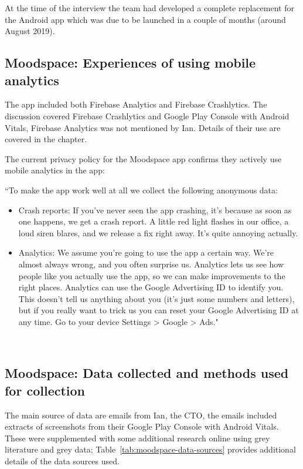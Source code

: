 At the time of the interview the team had developed a complete replacement for the Android app which was due to be launched in a couple of months (around August 2019).

\subsection{Moodspace: Experiences of using mobile analytics}
The app included both Firebase Analytics and Firebase Crashlytics. The discussion covered Firebase Crashlytics and Google Play Console with Android Vitals, Firebase Analytics was not mentioned by Ian. Details of their use are covered in the  chapter.

The current privacy policy for the Moodspace app confirms they actively use mobile analytics in the app: 

{\small
``To make the app work well at all we collect the following anonymous data:
    \begin{itemize}
        \itemsep0em
        \item Crash reports: If you've never seen the app crashing, it's because as soon as one happens, we get a crash report. A little red light flashes in our office, a loud siren blares, and we release a fix right away. It's quite annoying actually.
        \item Analytics: We assume you're going to use the app a certain way. We're almost always wrong, and you often surprise us. Analytics lets us see how people like you actually use the app, so we can make improvements to the right places. Analytics can use the Google Advertising ID to identify you. This doesn't tell us anything about you (it's just some numbers and letters), but if you really want to trick us you can reset your Google Advertising ID at any time. Go to your device Settings > Google > Ads."
    \end{itemize}~\citep{moodspace2021_privacy_policy}
}

\subsection{Moodspace: Data collected and methods used for collection}
The main source of data are emails from Ian, the CTO, the emails included extracts of screenshots from their Google Play Console with Android Vitals. These were supplemented with some additional research online using grey literature and grey data; Table~\ref{tab:moodspace-data-sources} provides additional details of the data sources used.


